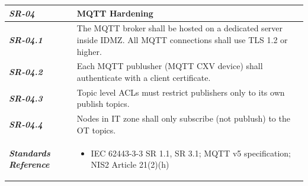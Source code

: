 \begin{tabularx}{\textwidth}{>{\bfseries}p{2.5cm} X}
    \textit{SR-04} & \textbf{MQTT Hardening} \vspace{0.5em}\\
\toprule
\textit{SR-04.1} &
    The MQTT broker shall be hosted on a dedicated server inside IDMZ. All MQTT connections shall use TLS 1.2 or higher.
    \vspace{0.5em}
\\
\textit{SR-04.2} &
    Each MQTT publusher (MQTT CXV device) shall authenticate with a client certificate.
    \vspace{0.5em}
    \\
\textit{SR-04.3} &
    Topic level ACLs must restrict publishers only to its own publish topics.
    \vspace{0.5em}
    \\
\textit{SR-04.4} &
    Nodes in IT zone shall only subscribe (not publush) to the OT topics.
    \vspace{0.5em}
    \\
\midrule
    \textit{Standards Reference} &
\begin{itemize}[label=-, noitemsep, topsep=0pt, leftmargin=*]
    \item IEC 62443-3-3 SR 1.1, SR 3.1; MQTT v5 specification; NIS2 Article 21(2)(h)
\end{itemize} \vspace{1em} \\ 
\end{tabularx}
\vspace{2em}

